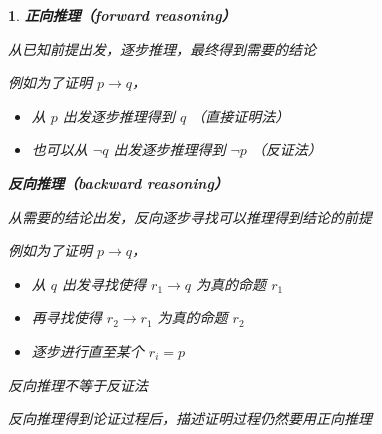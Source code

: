 \documentclass[UTF8]{report}
\theoremstyle{MyLineTheoremStyle} %
\theoremstyle{MyBlockTheoremStyle} %
\theoremstyle{MySubsubsectionStyle} %
\newtheorem{definition}{}
\begin{document}
\begin{definition}
    \textbf{正向推理（forward reasoning）}\par
    从已知前提出发，逐步推理，最终得到需要的结论\par
    例如为了证明 $p \rightarrow q$，\par
    \begin{itemize}
        \item 从 $p$ 出发逐步推理得到 $q$ （直接证明法）
        \item 也可以从 $\neg q$ 出发逐步推理得到 $\neg p$ （反证法）
    \end{itemize}

    \textbf{反向推理（backward reasoning）}\par
    从需要的结论出发，反向逐步寻找可以推理得到结论的前提\par
    例如为了证明 $p \rightarrow q$，\par
    \begin{itemize}
        \item 从 $q$ 出发寻找使得 $r_1 \rightarrow q$ 为真的命题 $r_1$
        \item 再寻找使得 $r_2 \rightarrow r_1$ 为真的命题 $r_2$
        \item 逐步进行直至某个 $r_i = p$
    \end{itemize}
    反向推理不等于反证法\par
    反向推理得到论证过程后，描述证明过程仍然要用正向推理\par


\end{definition}
\end{document}
